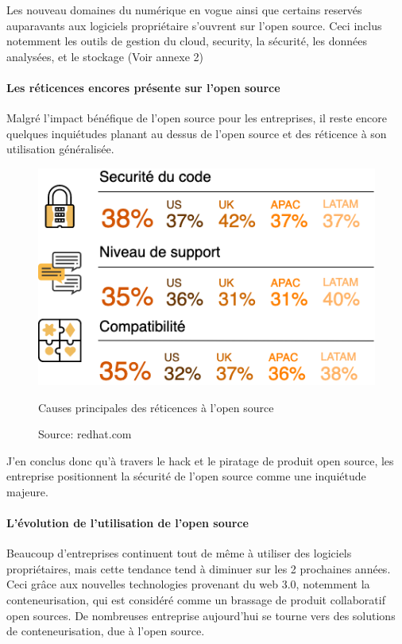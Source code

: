 					Les nouveau domaines du numérique en vogue ainsi que certains reservés auparavants aux logiciels propriétaire s'ouvrent sur l'open source. Ceci inclus notemment les outils de gestion du cloud, security, la sécurité, les données analysées, et le stockage (Voir annexe 2)

				\clearpage
				\paragraph{Les réticences encores présente sur l'open source\\}

					Malgré l'impact bénéfique de l'open source pour les entreprises, il reste encore quelques inquiétudes planant au dessus de l'open source et des réticence à son utilisation généralisée.

					\begin{figure}[h]
						\center
						\includegraphics[scale=0.70]{./img/Barreer_os.png}
						\caption{Causes principales des réticences à l'open source}
						\caption*{\color{silver}Source: redhat.com}					
					\end{figure}										

					J'en conclus donc qu'à travers le hack et le piratage de produit open source, les entreprise positionnent la sécurité de l'open source comme une inquiétude majeure.

				\paragraph{L'évolution de l'utilisation de l'open source\\}

					Beaucoup d'entreprises continuent tout de même à utiliser des logiciels propriétaires, mais cette tendance tend à diminuer sur les 2 prochaines années. Ceci grâce aux nouvelles technologies provenant du \gls{web 3.0}, notemment la \gls{conteneurisation}, qui est considéré comme un brassage de produit collaboratif open sources. De nombreuses entreprise aujourd'hui se tourne vers des solutions de conteneurisation, due à l'open source.
					

